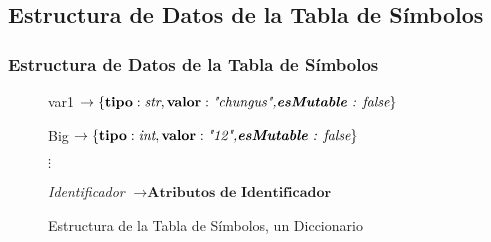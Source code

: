 \documentclass[14pt, aspectratio=169]{beamer}
\begin{document}
\subsection{Estructura de Datos de la Tabla de Símbolos}

\begin{frame}
    \frametitle{Estructura de Datos de la Tabla de Símbolos}
    \begin{figure}[H]
        \begin{mdframed}
            \textnormal{var1} $\rightarrow \left\{\textbf{tipo}: \textit{str},\textbf{valor}:\textit{"chungus",\textbf{esMutable} : false}\right\}$

            \textnormal{Big} $\rightarrow \left\{\textbf{tipo}: \textit{int},\textbf{valor}:\textit{"12",\textbf{esMutable} : false}\right\}$
            \begin{center}
                $\vdots$
            \end{center}

            \textit{Identificador}  $\rightarrow \textbf{Atributos de Identificador}$
        \end{mdframed}
        \label{fig: symbolTableStruct}
        \caption{Estructura de la Tabla de Símbolos, un Diccionario}
    \end{figure}
\end{frame}
\end{document}
